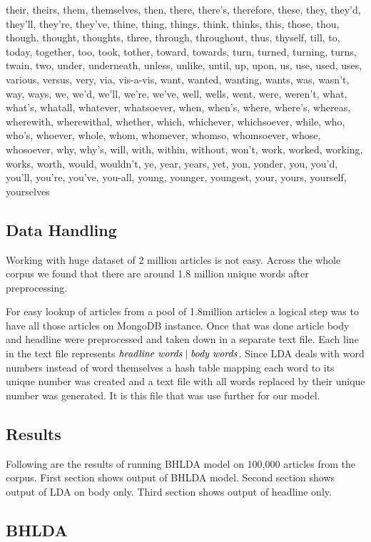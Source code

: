 \documentclass[a4paper]{article}
\begin{document}
their, theirs, them, themselves, then, there, there's, therefore, these, they, they'd, they'll, they're, they've, thine, thing, things, think, thinks, this, those, thou, though, thought, thoughts, three, through, throughout, thus, thyself, till, to, today, together, too, took, tother, toward, towards, turn, turned, turning, turns, twain, two, under, underneath, unless, unlike, until, up, upon, us, use, used, uses, various, versus, very, via, vis-a-vis, want, wanted, wanting, wants, was, wasn't, way, ways, we, we'd, we'll, we're, we've, well, wells, went, were, weren't, what, what's, whatall, whatever, whatsoever, when, when's, where, where's, whereas, wherewith, wherewithal, whether, which, whichever, whichsoever, while, who, who's, whoever, whole, whom, whomever, whomso, whomsoever, whose, whosoever, why, why's, will, with, within, without, won't, work, worked, working, works, worth, would, wouldn't, ye, year, years, yet, yon, yonder, you, you'd, you'll, you're, you've, you-all, young, younger, youngest, your, yours, yourself, yourselves


\subsection{Data Handling} \label{Data Handling}
Working with huge dataset of 2 million articles is not easy. Across  the whole corpus we found that there are around 1.8 million unique words after preprocessing. 

For easy lookup of articles from a pool of 1.8million articles a logical step was to have all those articles on MongoDB instance. Once that was done article body and headline were preprocessed and taken down in a separate text file. Each line in the text file represents $\emph{headline words} \mid \emph{body words}$. Since LDA deals with word numbers instead of word themselves a hash table mapping each word to its unique number was created and a text file with all words replaced by their unique number was generated. It is this file that was use further for our model. 

\subsection{Results}
Following are the results of running BHLDA model on 100,000 articles from the corpus. First section shows output of BHLDA model. Second section shows output of LDA on body only. Third section shows output of headline only.

\subsection{BHLDA} \label{BHLDA output}
\end{document}
